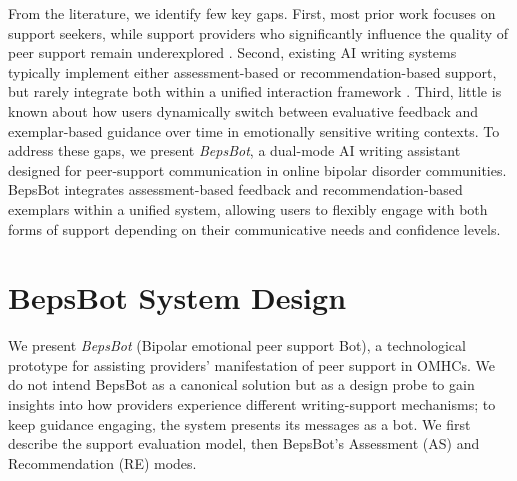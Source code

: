 \documentclass[]{llncs}
\begin{document}
From the literature, we identify few key gaps. First, most prior work focuses on support seekers, while support providers who significantly influence the quality of peer support remain underexplored \cite{Jones2019}. Second, existing AI writing systems typically implement either assessment-based or recommendation-based support, but rarely integrate both within a unified interaction framework \cite{Peng2020}. Third, little is known about how users dynamically switch between evaluative feedback and exemplar-based guidance over time in emotionally sensitive writing contexts. To address these gaps, we present \textit{BepsBot}, a dual-mode AI writing assistant designed for peer-support communication in online bipolar disorder communities. BepsBot integrates assessment-based feedback and recommendation-based exemplars within a unified system, allowing users to flexibly engage with both forms of support depending on their communicative needs and confidence levels.







\section{BepsBot System Design}
\label{sec:system_design}

We present \emph{BepsBot} (Bipolar emotional peer support Bot), a 
technological prototype for assisting providers' manifestation of peer 
support in OMHCs. We do not intend BepsBot as a canonical solution but 
as a design probe to gain insights into how providers experience 
different writing-support mechanisms; to keep guidance engaging, the 
system presents its messages as a bot. We first describe the support 
evaluation model, then BepsBot's Assessment (AS) and Recommendation (RE) 
modes.
\end{document}
